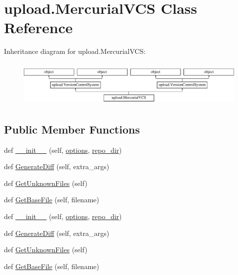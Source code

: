 \hypertarget{classupload_1_1MercurialVCS}{}\section{upload.\+Mercurial\+V\+CS Class Reference}
\label{classupload_1_1MercurialVCS}
Inheritance diagram for upload.\+Mercurial\+V\+CS\+:\begin{figure}[H]
\begin{center}
\leavevmode
\includegraphics[height=2.245989cm]{classupload_1_1MercurialVCS}
\end{center}
\end{figure}
\subsection*{Public Member Functions}
\begin{DoxyCompactItemize}
\item 
def \mbox{\hyperlink{classupload_1_1MercurialVCS_a33890f442dedbb7d9fd45c08b5baed56}{\+\_\+\+\_\+init\+\_\+\+\_\+}} (self, \mbox{\hyperlink{classupload_1_1VersionControlSystem_a4d57d043bc408887b94269fe4cea9556}{options}}, \mbox{\hyperlink{classupload_1_1MercurialVCS_a219c1e0ab9ce864e3231913762ea489b}{repo\+\_\+dir}})
\item 
def \mbox{\hyperlink{classupload_1_1MercurialVCS_a6c05746012d8cd435c94ace1465671ef}{Generate\+Diff}} (self, extra\+\_\+args)
\item 
def \mbox{\hyperlink{classupload_1_1MercurialVCS_a6190899fb86cd09ad84cc5d4b0ebd2f3}{Get\+Unknown\+Files}} (self)
\item 
def \mbox{\hyperlink{classupload_1_1MercurialVCS_a0cdc0cbe6ac4daab82f5f01e6ae2e670}{Get\+Base\+File}} (self, filename)
\item 
def \mbox{\hyperlink{classupload_1_1MercurialVCS_a33890f442dedbb7d9fd45c08b5baed56}{\+\_\+\+\_\+init\+\_\+\+\_\+}} (self, \mbox{\hyperlink{classupload_1_1VersionControlSystem_a4d57d043bc408887b94269fe4cea9556}{options}}, \mbox{\hyperlink{classupload_1_1MercurialVCS_a219c1e0ab9ce864e3231913762ea489b}{repo\+\_\+dir}})
\item 
def \mbox{\hyperlink{classupload_1_1MercurialVCS_a6c05746012d8cd435c94ace1465671ef}{Generate\+Diff}} (self, extra\+\_\+args)
\item 
def \mbox{\hyperlink{classupload_1_1MercurialVCS_a6190899fb86cd09ad84cc5d4b0ebd2f3}{Get\+Unknown\+Files}} (self)
\item 
def \mbox{\hyperlink{classupload_1_1MercurialVCS_a0cdc0cbe6ac4daab82f5f01e6ae2e670}{Get\+Base\+File}} (self, filename)
\end{DoxyCompactItemize}
